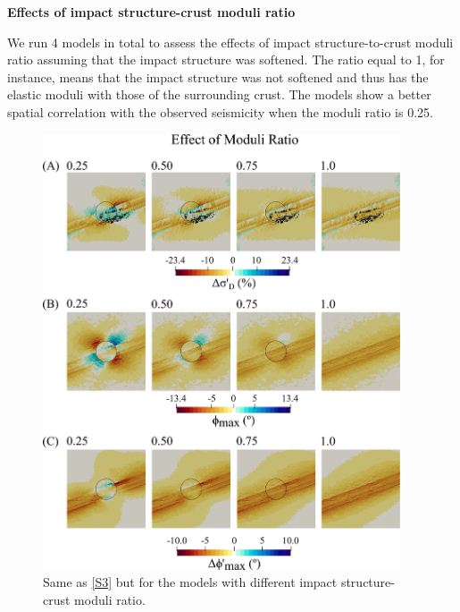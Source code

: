 \documentclass[draft,jgrga]{agutexSI2019}
\begin{document}
\begin{article}
\vspace{10mm} %


\noindent\textbf{Effects of impact structure-crust moduli ratio}

We run 4 models in total to assess the effects of impact structure-to-crust moduli ratio assuming that the impact structure was softened. The ratio equal to 1, for instance, means that the impact structure was not softened and thus has the elastic moduli with those of the surrounding crust. The models show a better spatial correlation with the observed seismicity when the moduli ratio is 0.25. 

\vspace{10mm} %

\begin{figure}[ht]
\includegraphics[width=25pc]{Figures/effect_of_moduli_ratio.png}
\caption{Same as \ref{S3} but for the models with different impact structure-crust moduli ratio.}
\label{S5}
\end{figure}

\vspace{10mm} %


\end{article}
\end{document}
